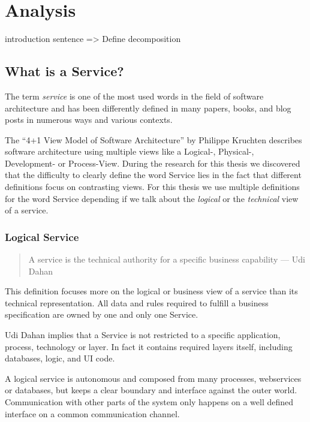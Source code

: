 
\chapter{Analysis}
\label{cha:analysis}

introduction sentence
=> Define decomposition

\section{What is a Service?}

The term \textit{service} is one of the most used words in the field of software architecture and has been differently defined in many papers, books, and blog posts in numerous ways and various contexts. 

The \enquote{4+1 View Model of Software Architecture} by Philippe Kruchten\cite{fourPlusOne} describes software architecture using multiple views like a \mbox{Logical-}, \mbox{Physical-}, \mbox{Development-} or  \mbox{Process-}View. During the research for this thesis we discovered that the difficulty to clearly define the word Service lies in the fact that different definitions focus on contrasting views. For this thesis we use multiple definitions for the word Service depending if we talk about the \textit{logical} or the \textit{technical} view of a service.

\subsection{Logical Service}

\begin{quotation}
A service is the technical authority for a specific business capability --- Udi Dahan\cite{serviceDefinitionDahan}
\end{quotation}
   
This definition focuses more on the logical or business view of a service than its technical representation. All data and rules required to fulfill a business specification are owned by one and only one Service. 

Udi Dahan implies that a Service is not restricted to a specific application, process, technology or layer. In fact it contains required layers itself, including databases, logic, and \gls{UI} code.

A logical service is autonomous and composed from many processes, webservices or databases, but keeps a clear boundary and interface against the outer world. Communication with other parts of the system only happens on a well defined interface on a common communication channel.

